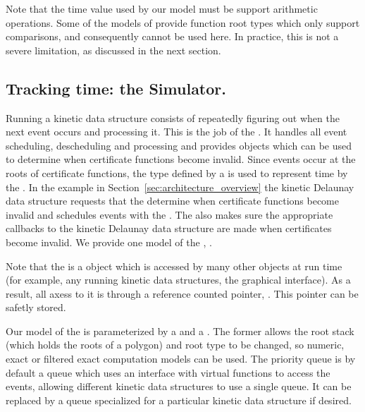 Note that the time value used by our  model
must be support arithmetic operations. Some of the models of
 provide function root types which only support
comparisons, and consequently cannot be used here. In practice, this
is not a severe limitation, as discussed in the next section.

\subsection{Tracking time: the Simulator.}
\label{sec:simulator}

Running a kinetic data structure consists of repeatedly figuring out
when the next event occurs and processing it. This is the job of the
. It handles all event scheduling, descheduling and
processing and provides objects which can be used to determine when
certificate functions become invalid. Since events occur at the roots
of certificate functions, the  type defined by a
 is used to represent time by the . In the
example in Section~\ref{sec:architecture_overview} the kinetic
Delaunay data structure requests that the  determine
when  certificate functions become invalid and
schedules events with the . The  also
makes sure the appropriate callbacks to the kinetic Delaunay data
structure are made when certificates become invalid. We provide one
model of the , .

Note that the  is a object which is accessed by many
other objects at run time (for example, any running kinetic data
structures, the graphical interface). As a result, all axess to it is
through a reference counted pointer, . This
pointer can be safetly stored.

Our model of the  is parameterized by a
 and a . The former allows the
root stack (which holds the roots of a polygon) and root
type to be changed, so numeric, exact or filtered exact computation
models can be used. The priority queue is by default a queue which
uses an interface with virtual functions to access the events,
allowing different kinetic data structures to use a single queue. It
can be replaced by a queue specialized for a particular kinetic data
structure if desired.

